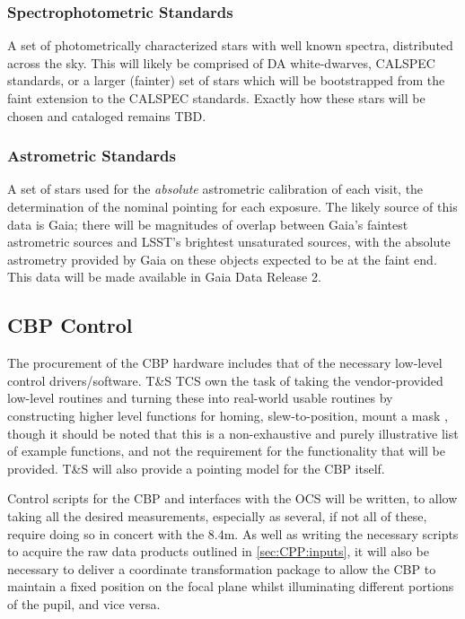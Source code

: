 \subsubsection{Spectrophotometric Standards}\label{sec:CPP:output:spectrophotometricStandards}
A set of photometrically characterized stars with well known spectra, distributed across the sky. This will likely be comprised of DA white-dwarves, CALSPEC standards, or a larger (\ie fainter) set of stars which will be bootstrapped from the faint extension to the CALSPEC standards\cite{2016ApJ...822...67N}.
\alg Exactly how these stars will be chosen and cataloged remains TBD.


\subsubsection{Astrometric Standards}\label{sec:CPP:output:astrometricStandards}
A set of stars used for the \emph{absolute} astrometric calibration of each visit, \ie the determination of the nominal pointing for each exposure. The likely source of this data is Gaia; there will be  magnitudes of overlap between Gaia's faintest astrometric sources and LSST's brightest unsaturated sources, with the absolute astrometry provided by Gaia on these objects expected to be \microarcsec at the faint end. This data will be made available in Gaia Data Release 2.




\subsection{CBP Control}\label{sec:CPP:CBP_control}
The procurement of the CBP hardware includes that of the necessary low-level control drivers/software. T\&S TCS own the task of taking the vendor-provided low-level routines and turning these into real-world usable routines by constructing higher level functions for \eg homing, slew-to-position, mount a mask \etc, though it should be noted that this is a non-exhaustive and purely illustrative list of example functions, and not the requirement for the functionality that will be provided. T\&S will also provide a pointing model for the CBP itself.

Control scripts for the CBP and interfaces with the OCS will be written, to allow taking all the desired measurements, especially as several, if not all of these, require doing so in concert with the 8.4m. As well as writing the necessary scripts to acquire the raw data products outlined in \secsymbol\ref{sec:CPP:inputs}, it will also be necessary to deliver a coordinate transformation package to allow the CBP to maintain a fixed position on the focal plane whilst illuminating different portions of the pupil, and vice versa.








